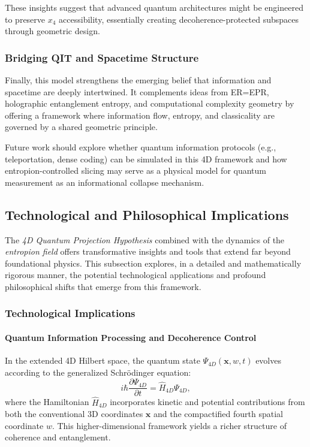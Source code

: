 \documentclass[12pt]{article}
\begin{document}
These insights suggest that advanced quantum architectures might be engineered to preserve $x_4$ accessibility, essentially creating decoherence-protected subspaces through geometric design.

\subsubsection*{Bridging QIT and Spacetime Structure}

Finally, this model strengthens the emerging belief that information and spacetime are deeply intertwined. It complements ideas from ER=EPR, holographic entanglement entropy, and computational complexity geometry by offering a framework where information flow, entropy, and classicality are governed by a shared geometric principle.

Future work should explore whether quantum information protocols (e.g., teleportation, dense coding) can be simulated in this 4D framework and how entropion-controlled slicing may serve as a physical model for quantum measurement as an informational collapse mechanism.
\subsection{Technological and Philosophical Implications}

The \emph{4D Quantum Projection Hypothesis} combined with the dynamics of the \emph{entropion field} offers transformative insights and tools that extend far beyond foundational physics. This subsection explores, in a detailed and mathematically rigorous manner, the potential technological applications and profound philosophical shifts that emerge from this framework.

\subsubsection*{Technological Implications}

\paragraph{Quantum Information Processing and Decoherence Control}

In the extended 4D Hilbert space, the quantum state \(\Psi_{4D}(\mathbf{x}, w, t)\) evolves according to the generalized Schrödinger equation:
\begin{equation}
i \hbar \frac{\partial \Psi_{4D}}{\partial t} = \hat{H}_{4D} \Psi_{4D},
\label{eq:4D_Schrodinger_expanded}
\end{equation}
where the Hamiltonian \(\hat{H}_{4D}\) incorporates kinetic and potential contributions from both the conventional 3D coordinates \(\mathbf{x}\) and the compactified fourth spatial coordinate \(w\). This higher-dimensional framework yields a richer structure of coherence and entanglement.
\end{document}
